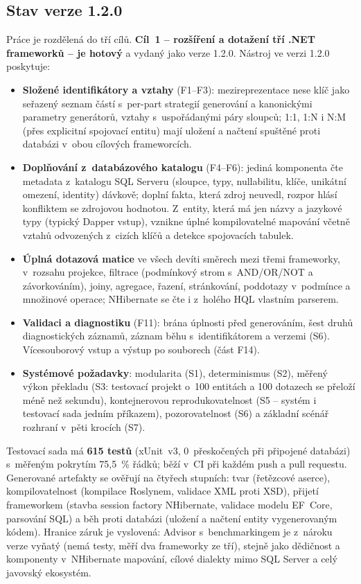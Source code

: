 \documentclass{article}
\begin{document}
\subsection{Stav verze 1.2.0}

Práce je rozdělená do tří cílů. \textbf{Cíl~1 -- rozšíření a dotažení tří .NET frameworků -- je hotový} a vydaný jako verze 1.2.0. Nástroj ve verzi 1.2.0 poskytuje:

\begin{itemize}[leftmargin=*]
\item \textbf{Složené identifikátory a vztahy} (F1--F3): mezireprezentace nese klíč jako seřazený seznam částí s~per-part strategií generování a kanonickými parametry generátorů, vztahy s~uspořádanými páry sloupců; 1:1, 1:N i N:M (přes explicitní spojovací entitu) mají uložení a načtení spuštěné proti databázi v~obou cílových frameworcích.
\item \textbf{Doplňování z~databázového katalogu} (F4--F6): jediná komponenta čte metadata z~katalogu SQL Serveru (sloupce, typy, nullabilitu, klíče, unikátní omezení, identity) dávkově; doplní fakta, která zdroj neuvedl, rozpor hlásí konfliktem se zdrojovou hodnotou. Z~entity, která má jen názvy a jazykové typy (typický Dapper vstup), vznikne úplné kompilovatelné mapování včetně vztahů odvozených z~cizích klíčů a detekce spojovacích tabulek.
\item \textbf{Úplná dotazová matice} ve všech devíti směrech mezi třemi frameworky, v~rozsahu projekce, filtrace (podmínkový strom s~AND/OR/NOT a závorkováním), joiny, agregace, řazení, stránkování, poddotazy v~podmínce a množinové operace; NHibernate se čte i z~holého HQL vlastním parserem.
\item \textbf{Validaci a diagnostiku} (F11): brána úplnosti před generováním, šest druhů diagnostických záznamů, záznam běhu s~identifikátorem a verzemi (S6). Vícesouborový vstup a výstup po souborech (část F14).
\item \textbf{Systémové požadavky}: modularita (S1), determinismus (S2), měřený výkon překladu (S3: testovací projekt o~100 entitách a 100 dotazech se přeloží méně než sekundu), kontejnerovou reprodukovatelnost (S5 -- systém i testovací sada jedním příkazem), pozorovatelnost (S6) a základní scénář rozhraní v~pěti krocích (S7).
\end{itemize}

Testovací sada má \textbf{615 testů} (xUnit~v3, 0~přeskočených při připojené databázi) s~měřeným pokrytím 75{,}5~\% řádků; běží v~CI při každém push a pull requestu. Generované artefakty se ověřují na čtyřech stupních: tvar (řetězcové aserce), kompilovatelnost (kompilace Roslynem, validace XML proti XSD), přijetí frameworkem (stavba session factory NHibernate, validace modelu EF~Core, parsování SQL) a běh proti databázi (uložení a načtení entity vygenerovaným kódem). Hranice záruk je vyslovená: Advisor s~benchmarkingem je z~nároku verze vyňatý (nemá testy, měří dva frameworky ze tří), stejně jako dědičnost a komponenty v~NHibernate mapování, cílové dialekty mimo SQL Server a celý javovský ekosystém.
\end{document}
